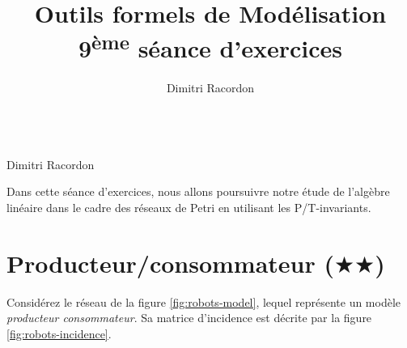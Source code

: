 \documentclass[a4paper, titlepage]{article}
\makeatletter
\numberwithin{figure}{section}
\numberwithin{table}{section}
\newcommand\objective[1]{\def\@objective{#1}}
\newcommand{\makecustomtitle}{%
	\begin{center}
		\huge\@title \\
		[1ex]\small Dimitri Racordon
	\end{center}
	\@objective
}
\makeatother
\begin{document}
\title{Outils formels de Modélisation \\ 9\textsuperscript{ème} séance d'exercices}
\author{Dimitri Racordon}
\objective{
Dans cette séance d'exercices, nous allons poursuivre notre étude de l'algèbre linéaire dans le cadre des réseaux de Petri en utilisant les P/T-invariants.
}

\makecustomtitle

\section{Producteur/consommateur ($\bigstar\bigstar$)}
Considérez le réseau de la figure \ref{fig:robots-model}, lequel représente un modèle \emph{producteur consommateur}.
Sa matrice d'incidence est décrite par la figure \ref{fig:robots-incidence}.
\end{document}

